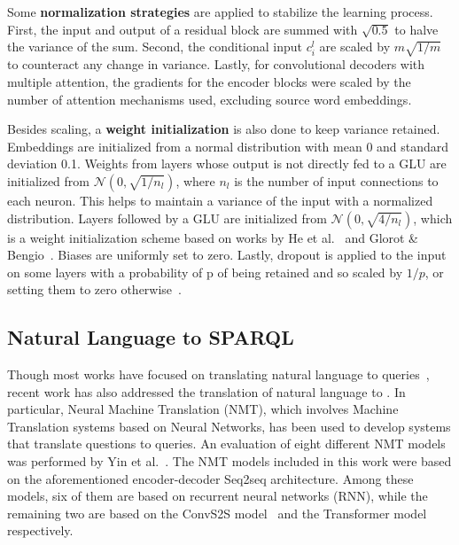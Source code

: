 Some \textbf{normalization strategies} are applied to stabilize the learning process. First, 
the input and output of a residual block are summed with $\sqrt{0.5}$ to halve the variance of 
the sum. Second, the conditional input $c_i^l$ are scaled by $m\sqrt{1/m}$ to counteract any 
change in variance. Lastly, for convolutional decoders with multiple attention, the gradients 
for the encoder blocks were scaled by the number of attention mechanisms used, excluding source 
word embeddings.

Besides scaling, a \textbf{weight initialization} is also done to keep variance retained. 
Embeddings are initialized from a normal distribution with mean 0 and standard deviation 0.1. 
Weights from layers whose output is not directly fed to a GLU are initialized from 
$\mathcal{N}(0, \sqrt{1/n_l})$, where $n_l$ is the number of input connections to each neuron. 
This helps to maintain a variance of the input with a normalized distribution. Layers followed 
by a GLU are initialized from $\mathcal{N}(0, \sqrt{4/n_l})$, which is a weight initialization 
scheme based on works by He et al.~\cite{semPar:HeZRS15} and Glorot \& Bengio~\cite{semPar:GlorotB10}. 
Biases are uniformly set to zero. Lastly, dropout is applied to the input on some layers with a 
probability of p of being retained and so scaled by $1/p$, or setting them to zero 
otherwise~\cite{semPar:SutskeverVL14}.

\subsection{Natural Language to SPARQL}
\label{cap2:theoFrame/semPar/nlToSparql}
Though most works have focused on translating natural language to \SQL{} queries~\cite{nmt:CaiXZYLL18,nmt:ZhongCoRR17}, 
recent work has also addressed the translation of natural language to \SPARQL{}. In particular, 
Neural Machine Translation (NMT), which involves Machine Translation systems based on Neural 
Networks, has been used to develop systems that translate questions to \SPARQL{} queries. An 
evaluation of eight different NMT models was performed by Yin et al.~\cite{nmt:nl-to-sparql-Yin19}. 
The NMT models included in this work were based on the aforementioned encoder-decoder Seq2seq 
architecture. Among these models, six of them are based on recurrent neural networks (RNN), 
while the remaining two are based on the ConvS2S model~\cite{nmt:convS2S-GehringAGYD17} and 
the Transformer model~\cite{semPar:VaswaniSPUJGKP17} respectively.

